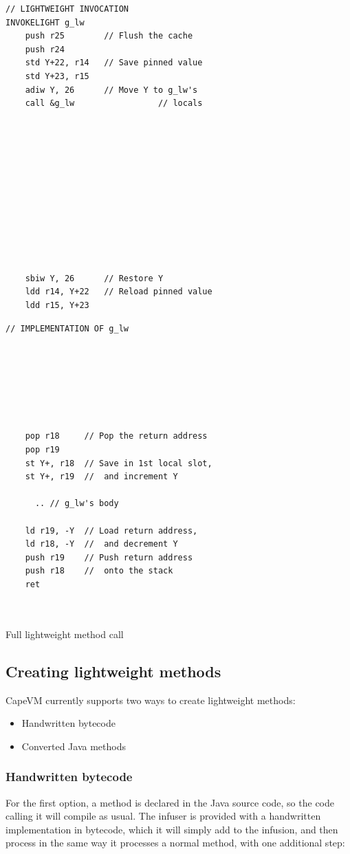 \begin{listing}
\centering
\begin{minipage}[t]{0.48\textwidth}
\begin{verbatim}
// LIGHTWEIGHT INVOCATION
INVOKELIGHT g_lw
    push r25        // Flush the cache
    push r24
    std Y+22, r14   // Save pinned value
    std Y+23, r15
    adiw Y, 26      // Move Y to g_lw's
    call &g_lw                 // locals












    sbiw Y, 26      // Restore Y
    ldd r14, Y+22   // Reload pinned value
    ldd r15, Y+23
\end{verbatim}
\end{minipage}\hfill
\begin{minipage}[t]{0.48\textwidth}
\centering
\begin{verbatim}
// IMPLEMENTATION OF g_lw







    pop r18     // Pop the return address
    pop r19
    st Y+, r18  // Save in 1st local slot,
    st Y+, r19  //  and increment Y

      .. // g_lw's body

    ld r19, -Y  // Load return address,
    ld r18, -Y  //  and decrement Y
    push r19    // Push return address
    push r18    //  onto the stack
    ret



\end{verbatim}
\end{minipage}
\caption{Full lightweight method call}
\label{lst-full-lighweight-method-call}
\end{listing}


\subsection{Creating lightweight methods}
CapeVM currently supports two ways to create lightweight methods:
\begin{itemize}
	\item Handwritten bytecode
	\item Converted Java methods
\end{itemize}

\subsubsection{Handwritten bytecode}
For the first option, a method is declared  in the Java source code, so the code calling it will compile as usual. The infuser is provided with a handwritten implementation in bytecode, which it will simply add to the infusion, and then process in the same way it processes a normal method, with one additional step:

